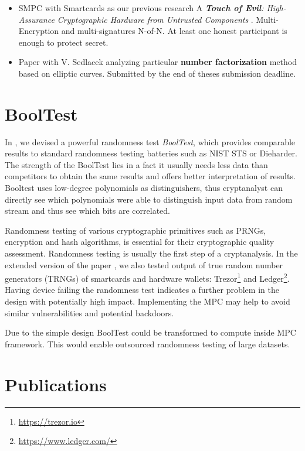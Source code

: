 \documentclass[
  digital, %
  twoside, %
  table,   %
  lof,     %
  lot,     %
]{fithesis3}
\theoremstyle{definition}
\theoremstyle{remark}
\begin{document}
\begin{ecmmnt}
\begin{itemize}
	\item SMPC with Smartcards as our previous research A {\it {\bf{Touch of Evil}}: High-Assurance Cryptographic Hardware from Untrusted Components} \cite{2017-ccs-mavroudis}. Multi-Encryption and multi-signatures N-of-N. At least one honest participant is enough to protect secret.
	
	\item Paper with V. Sedlacek analyzing particular {\bf{number factorization}} method based on elliptic curves. Submitted by the end of theses submission deadline.
	
\end{itemize}
\end{ecmmnt}

\section{BoolTest}\label{sec:res:booltest}
In \cite{booltest_secrypt2017}, we devised a powerful randomness test {\emph{BoolTest}}, which provides comparable results to standard randomness testing batteries such as NIST STS or Dieharder. The strength of the BoolTest lies in a fact it usually needs less data than competitors to obtain the same results and offers better interpretation of results. Booltest uses low-degree polynomials as distinguishers, thus cryptanalyst can directly see which polynomials were able to distinguish input data from random stream and thus see which bits are correlated.

Randomness testing of various cryptographic primitives such as PRNGs, encryption and hash algorithms, is essential for their cryptographic quality assessment. Randomness testing is usually the first step of a cryptanalysis. In the extended version of the paper \cite{booltest2}, we also tested output of true random number generators (TRNGs) of smartcards and hardware wallets: Trezor\footnote{\url{https://trezor.io}} and Ledger\footnote{\url{https://www.ledger.com/}}. Having device failing the randomness test indicates a further problem in the design with potentially high impact. Implementing the MPC may help to avoid similar vulnerabilities and potential backdoors. 

Due to the simple design BoolTest could be transformed to compute inside MPC framework. This would enable outsourced randomness testing of large datasets. 

\section{Publications}\label{sec:res:pubs}
\end{document}

